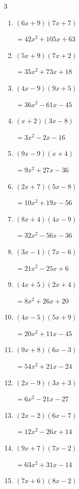 \begin{multicols}{3}
\begin{enumerate}
        $=32x^{2}+80x+48$

\columnbreak %

\resetques

  \item $(6x+9)(7x+7)$

        $=42x^{2}+105x+63$

  \item $(5x+9)(7x+2)$

        $=35x^{2}+73x+18$

  \item $(4x-9)(9x+5)$

        $=36x^{2}-61x-45$

  \item $(x+2)(3x-8)$

        $=3x^{2}-2x-16$

  \item $(9x-9)(x+4)$

        $=9x^{2}+27x-36$

  \item $(2x+7)(5x-8)$

        $=10x^{2}+19x-56$

  \item $(8x+4)(4x-9)$

        $=32x^{2}-56x-36$

  \item $(3x-1)(7x-6)$

        $=21x^{2}-25x+6$

  \item $(4x+5)(2x+4)$

        $=8x^{2}+26x+20$

  \item $(4x-5)(5x+9)$

        $=20x^{2}+11x-45$

  \item $(9x+8)(6x-3)$

        $=54x^{2}+21x-24$

  \item $(2x-9)(3x+3)$

        $=6x^{2}-21x-27$

  \item $(2x-2)(6x-7)$

        $=12x^{2}-26x+14$

  \item $(9x+7)(7x-2)$

        $=63x^{2}+31x-14$

  \item $(7x+6)(8x-2)$


\end{enumerate}
\end{multicols}

